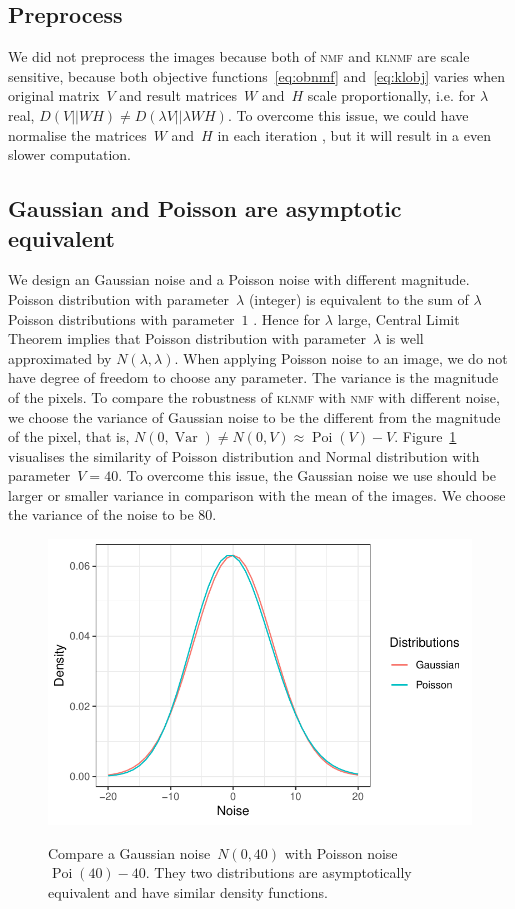 \subsection{Preprocess}
We did not preprocess the images because both of \textsc{nmf} and \textsc{klnmf} are scale sensitive, because both objective functions~\eqref{eq:obnmf} and~\eqref{eq:klobj} varies when original matrix~$V$ and result matrices~$W$ and~$H$ scale proportionally, i.e. for $\lambda$ real, $D(V||WH)\neq D(\lambda V||\lambda WH)$. To overcome this issue, we could have normalise the matrices~$W$ and~$H$ in each iteration \citep{scaless}, but it will result in a even slower computation.

\subsection{Gaussian and Poisson are asymptotic equivalent}
 We design an Gaussian noise and a Poisson noise with different magnitude.
 Poisson distribution with parameter~$\lambda$ (integer) is equivalent to the sum of $\lambda$ Poisson distributions with parameter~$1$ \citep[][p. 45]{Walck:1996cca}.
 Hence for $\lambda$ large, Central Limit Theorem implies that Poisson distribution with parameter~$\lambda$ is well approximated by $N(\lambda,\lambda)$.
 When applying Poisson noise to an image, we do not have degree of freedom to choose any parameter.
 The variance is the magnitude of the pixels. To compare the robustness of \textsc{klnmf} with \textsc{nmf} with different noise, we choose the variance of Gaussian noise to be the different from the magnitude of the pixel, that is, $N(0,\operatorname{Var})\neq N(0,V)\approx \operatorname{Poi}(V)-V$.
 Figure~\ref{noise} visualises the similarity of Poisson distribution and Normal distribution with parameter~$V=40$. To overcome this issue, the Gaussian noise we use should be larger or smaller variance in comparison with the mean of the images. We choose the variance of the noise to be $80$.
\begin{figure}
  \centering
  \includegraphics[scale=1]{resource/noise}\\
  \caption{Compare a Gaussian noise~$N(0,40)$ with Poisson noise $\operatorname{Poi}(40)-40$. They two distributions are asymptotically equivalent and have similar density functions.}\label{noise}
\end{figure}

